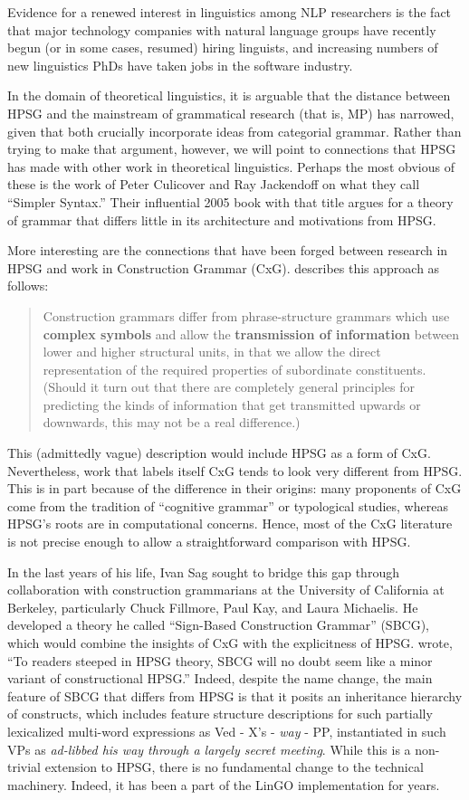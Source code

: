 \documentclass[output=paper]{langsci/langscibook}
\begin{document}
Evidence for a renewed interest in linguistics among NLP researchers is the fact that major technology companies with natural language groups have recently begun (or in some cases, resumed) hiring linguists, and increasing numbers of new linguistics PhDs have taken jobs in the software industry.  

In the domain of theoretical linguistics, it is arguable that the distance between HPSG and the mainstream of grammatical research (that is, MP) has narrowed, given that both crucially incorporate ideas from categorial grammar.  Rather than trying to make that argument, however, we will point to connections that HPSG has made with other work in theoretical linguistics.  Perhaps the most obvious of these is the work of Peter Culicover and Ray Jackendoff on what they call ``Simpler Syntax.''  Their influential 2005 book with that title \citep{CJ2005a} argues for a theory of grammar that differs little in its architecture and motivations from HPSG.

More interesting are the connections that have been forged between research in HPSG and work in Construction Grammar (CxG).  \citet{Fillmore88a} describes this approach as follows:
\begin{quote}
Construction grammars differ from phrase-structure grammars which use {\bf complex symbols} and allow the {\bf transmission of information} between lower and higher structural units, in that we allow the direct representation of the required properties of subordinate constituents.  (Should it turn out that there are completely general principles for predicting the kinds of information that get transmitted upwards or downwards, this may not be a real difference.)
\end{quote}
This (admittedly vague) description would include HPSG as a form of CxG.  Nevertheless, work that labels itself CxG tends to look very different from HPSG.  This is in part because of the difference in their origins: many proponents of CxG come from the tradition of ``cognitive grammar'' or typological
studies, whereas HPSG's roots are in computational concerns. Hence, most of the CxG literature is not precise enough to allow a straightforward comparison with HPSG.

In the last years of his life, Ivan Sag sought to bridge this gap through collaboration with construction grammarians at the University of California at Berkeley, particularly Chuck Fillmore, Paul Kay, and Laura Michaelis.  He developed a theory he called ``Sign-Based Construction Grammar'' (SBCG), which would combine the insights of CxG with the explicitness of HPSG.  \citet{Sag2012a} wrote, ``To readers steeped in HPSG theory, SBCG will no doubt seem like a minor variant of constructional HPSG.''  Indeed, despite the name change, the main feature of SBCG that differs from HPSG is that it posits an inheritance hierarchy of constructs, which includes feature structure descriptions for such partially lexicalized multi-word expressions as Ved - X's - {\it way} - PP, instantiated in such VPs as {\it ad-libbed his way through a largely
secret meeting}.  While this is a non-trivial extension to HPSG, there is no fundamental change to the technical machinery.  Indeed, it has been a part of the LinGO implementation for years. 
\end{document}
